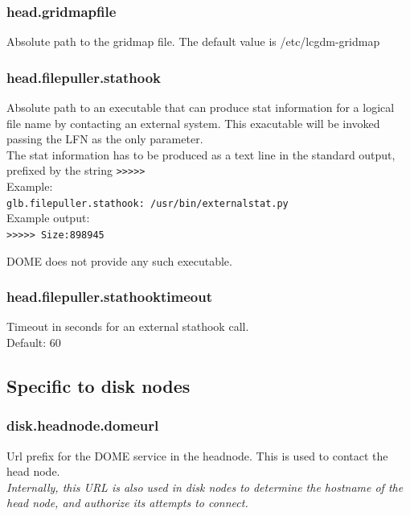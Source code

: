 \documentclass[a4paper,10pt]{scrreprt}
\begin{document}
\subsubsection{head.gridmapfile}

Absolute path to the gridmap file. The default value is /etc/lcgdm-gridmap

\subsubsection{head.filepuller.stathook}

Absolute path to an executable that can produce stat information for a logical file name by contacting an external system. This exacutable
will be invoked passing the LFN as the only parameter.\\
The stat information has to be produced as a text line in the standard output, prefixed by the string \lstinline">>>>>" \\
Example:\\
\lstinline"glb.filepuller.stathook: /usr/bin/externalstat.py"\\
Example output:\\
\lstinline">>>>> Size:898945"

DOME does not provide any such executable.\\

\subsubsection{head.filepuller.stathooktimeout}
Timeout in seconds for an external stathook call.\\
Default: 60\\

\subsection{Specific to disk nodes}

\subsubsection{disk.headnode.domeurl}
Url prefix for the DOME service in the headnode. This is used to contact the head node.\\

\textit{Internally, this URL is also used in disk nodes to determine the hostname of the head node, and authorize its attempts to connect.}\\
\end{document}
